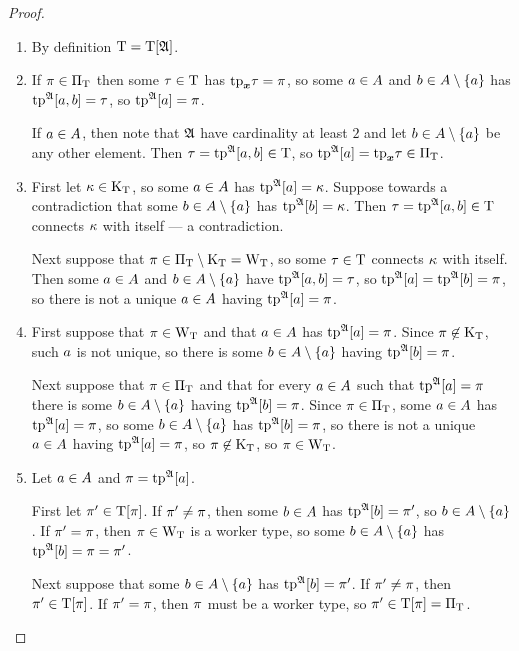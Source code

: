 \begin{proof}

\begin{enumerate}
  \item
  By definition $\mathrm{T} = \mathrm{T}[\mathfrak{A}]$.
  
  \item
  If $\pi\in{\Pi}_{\mathrm{T}}$ then some $\tau\in\mathrm{T}$ has $\mathrm{tp}_{\bm{x}}\tau = \pi$,
  so some $a\in A$ and $b\in A\setminus\left\{a\right\}$ has
  $\operatorname{tp}^{\mathfrak{A}}[a,b] = \tau$, so $\operatorname{tp}^{\mathfrak{A}}[a] = \pi$.
  
  If $a\in A$, then note that $\mathfrak{A}$ have cardinality at least $2$
  and let $b\in A\setminus\left\{a\right\}$ be any other element.
  Then $\tau = \operatorname{tp}^{\mathfrak{A}}[a,b] \in \mathrm{T}$, so $\operatorname{tp}^{\mathfrak{A}}[a] = \mathrm{tp}_{\bm{x}}\tau \in
  {\Pi}_{\mathrm{T}}$.
  
  \item
  First let $\kappa\in{\mathrm{K}}_{\mathrm{T}}$, so some $a\in A$ has $\operatorname{tp}^{\mathfrak{A}}[a] = \kappa$.
  Suppose towards a contradiction that
  some $b\in A\setminus\left\{a\right\}$ has $\operatorname{tp}^{\mathfrak{A}}[b] = \kappa$.
  Then $\tau = \operatorname{tp}^{\mathfrak{A}}[a,b] \in \mathrm{T}$ connects $\kappa$ with itself
  --- a contradiction.
  
  Next suppose that $\pi\in{\Pi}_{\mathrm{T}}\setminus{\mathrm{K}}_{\mathrm{T}} = {\mathrm{W}}_{\mathrm{T}}$,
  so some $\tau\in\mathrm{T}$ connects $\kappa$ with itself.
  Then some $a\in A$ and $b\in A\setminus\left\{a\right\}$
  have $\operatorname{tp}^{\mathfrak{A}}[a,b] = \tau$,
  so $\operatorname{tp}^{\mathfrak{A}}[a] = \operatorname{tp}^{\mathfrak{A}}[b] = \pi$,
  so there is not a unique $a\in A$ having $\operatorname{tp}^{\mathfrak{A}}[a] = \pi$.
  
  \item
  First suppose that $\pi\in{\mathrm{W}}_{\mathrm{T}}$ and that $a\in A$
  has $\operatorname{tp}^{\mathfrak{A}}[a] = \pi$.
  Since $\pi\not\in{\mathrm{K}}_{\mathrm{T}}$, such $a$ is not unique, so there is some
  $b\in A\setminus\left\{a\right\}$ having $\operatorname{tp}^{\mathfrak{A}}[b] = \pi$.
  
  Next suppose that $\pi\in{\Pi}_{\mathrm{T}}$ and that for every $a\in A$ such that
  $\operatorname{tp}^{\mathfrak{A}}[a] = \pi$ there is some $b\in A\setminus\left\{a\right\}$ having
  $\operatorname{tp}^{\mathfrak{A}}[b] = \pi$.
  Since $\pi\in{\Pi}_{\mathrm{T}}$, some $a\in A$ has $\operatorname{tp}^{\mathfrak{A}}[a] = \pi$, so some
  $b\in A\setminus\left\{a\right\}$ has $\operatorname{tp}^{\mathfrak{A}}[b] = \pi$, so there is not a unique
  $a\in A$ having $\operatorname{tp}^{\mathfrak{A}}[a] = \pi$, so $\pi\not\in{\mathrm{K}}_{\mathrm{T}}$, so
  $\pi\in{\mathrm{W}}_{\mathrm{T}}$.
  \item
  Let $a\in A$ and $\pi = \operatorname{tp}^{\mathfrak{A}}[a]$.
  
  First let ${\pi'}\in\mathrm{T}[\pi]$.
  If ${\pi'} \neq \pi$, then some $b \in A$ has
  $\operatorname{tp}^{\mathfrak{A}}[b] = {\pi'}$, so $b \in A\setminus\left\{a\right\}$.
  If ${\pi'} = \pi$, then $\pi \in {\mathrm{W}}_{\mathrm{T}}$ is a worker type,
  so some $b\in A\setminus\left\{a\right\}$ has
  $\operatorname{tp}^{\mathfrak{A}}[b] = \pi = {\pi'}$.
  
  Next suppose that some $b\in A\setminus\left\{a\right\}$ has $\operatorname{tp}^{\mathfrak{A}}[b] = {\pi'}$.
  If ${\pi'} \neq \pi$, then ${\pi'} \in \mathrm{T}[\pi]$.
  If ${\pi'} = \pi$, then $\pi$ must be a worker type,
  so ${\pi'} \in \mathrm{T}[\pi] = {\Pi}_{\mathrm{T}}$.
\end{enumerate}
\end{proof}

